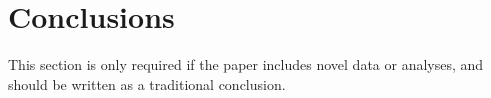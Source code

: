 \section*{Conclusions} %
This section is only required if the paper includes novel data or analyses, and should be written as a traditional conclusion.
